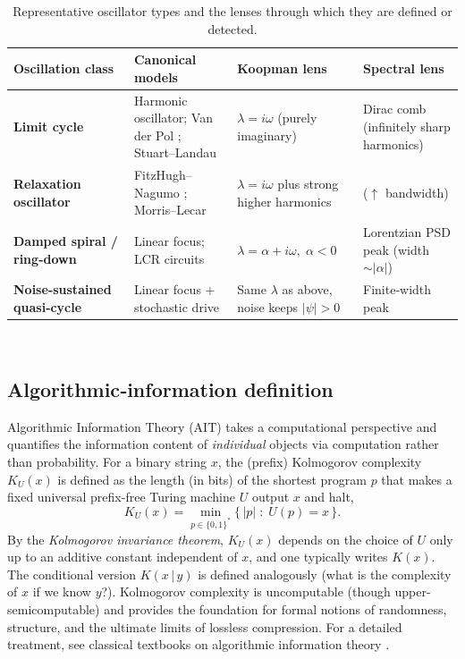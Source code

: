 \begin{table}[t!]
\centering
\caption{Representative oscillator types and the lenses through which they are defined or detected.}
\label{tab:osc_types}
\begin{tabular}{p{3.3cm}p{4.5cm}p{3.5cm}p{3.3cm}}
\toprule
\textbf{Oscillation class} & \textbf{Canonical models} & \textbf{Koopman lens } & \textbf{Spectral lens}\\
\midrule
\textbf{Limit cycle} & Harmonic oscillator; Van der Pol \cite{VanDerPol26}; Stuart–Landau \cite{Stuart58} & $\lambda = i\omega$ (purely imaginary) & Dirac comb (infinitely sharp harmonics)  \\
\addlinespace[2pt]
\textbf{Relaxation oscillator} & FitzHugh–Nagumo \cite{FitzHugh61}; Morris–Lecar \cite{Morris81} & $\lambda  = i\omega$ plus strong higher harmonics &   ($\uparrow$ bandwidth) \\
\addlinespace[2pt]
\textbf{Damped spiral / ring‑down} & Linear focus; LCR circuits & $\lambda = \alpha + i\omega,\; \alpha < 0$ & Lorentzian PSD peak (width $\sim|\alpha|$)  \\
\addlinespace[2pt]
\textbf{Noise‑sustained quasi‑cycle} & Linear focus $+$ stochastic drive \cite{McKane05} & Same $\lambda$ as above, noise keeps $| \psi|>0$ & Finite‑width peak  \\
\bottomrule
\end{tabular}\\[2pt]
\end{table}
\subsection*{Algorithmic‑information definition}

Algorithmic Information Theory (AIT) takes a computational perspective and quantifies the information content of \emph{individual} objects via computation rather than probability. 
For a binary string $x$, the (prefix) Kolmogorov complexity $K_U(x)$ is defined as the length (in bits) of the shortest program $p$ that makes a fixed universal prefix-free Turing machine $U$ output $x$ and halt,
\begin{equation}
K_U(x) = \min_{p \in \{0,1\}^*} \{\, |p| \; : \; U(p) = x \,\}.
\end{equation}
By the \emph{Kolmogorov invariance theorem}, $K_U(x)$ depends on the choice of $U$ only up to an additive constant independent of $x$, and one typically writes $K(x)$. 
The conditional version $K(x\,|\,y)$ is defined analogously (what is the complexity of $x$ if we know $y$?). 
Kolmogorov complexity is uncomputable (though upper-semicomputable) and provides the foundation for formal notions of randomness, structure, and the ultimate limits of lossless compression.
For a detailed treatment, see classical textbooks on algorithmic information theory \cite{cover_elements_2006,li_applications_2007}.



